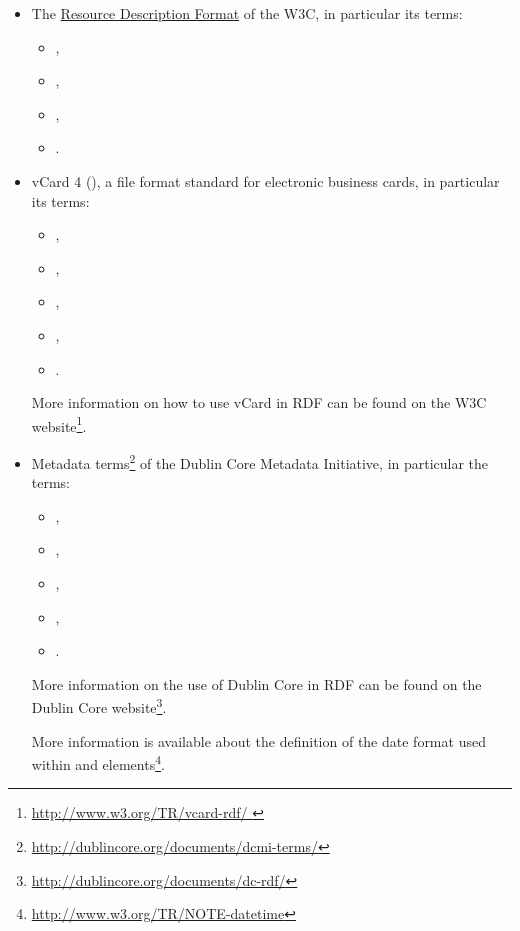 \begin{itemize}
	\item  {
	
     The \href{http://www.w3.org/RDF/ }{ Resource Description Format} of the 
     W3C, in particular its terms:
     \begin{itemize}
		\item {}, 
		\item {}, 
		\item {}, 
		\item {}.
	\end{itemize}
	}
	\item  {

	vCard 4 (\cite{rfc6350}), a file format standard for electronic business 
    cards, in particular its terms:
    	\begin{itemize}
		\item {}, 
		\item {}, 
		\item {}, 
		\item {},
		\item {}.
	\end{itemize}

	More information on how to use vCard in RDF can be found 
    on the W3C website\footnote[1]{\url{http://www.w3.org/TR/vcard-rdf/ }}.
	
	}
	\item {
	
	Metadata terms\footnote[2]{\url{http://dublincore.org/documents/dcmi-terms/}} of 
	the Dublin Core Metadata Initiative, in particular the terms: 

	\begin{itemize}
		\item {}, 
		\item {}, 
		\item {}, 
		\item {},
		\item {}.
	\end{itemize}
		
	More information on the use of Dublin Core in RDF can be found 
	on the Dublin Core website{\footnote[3]{\url{http://dublincore.org/documents/dc-rdf/}}}. } 
	
	More information is available about the definition of the date format used within  and 
	 elements{\footnote[4]{\url{http://www.w3.org/TR/NOTE-datetime}}}.

\end{itemize}


